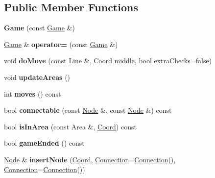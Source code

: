 \subsection*{Public Member Functions}
\begin{DoxyCompactItemize}
\item 
\hypertarget{classGame_aa79443880de5f26387c2a1c70c8c1aae}{{\bfseries Game} (const \hyperlink{classGame}{Game} \&)}\label{classGame_aa79443880de5f26387c2a1c70c8c1aae}

\item 
\hypertarget{classGame_aec1439ca4c76f4a002c235134d590158}{\hyperlink{classGame}{Game} \& {\bfseries operator=} (const \hyperlink{classGame}{Game} \&)}\label{classGame_aec1439ca4c76f4a002c235134d590158}

\item 
\hypertarget{classGame_a23882a4a63f1ea6c17bc6330440ff6f4}{void {\bfseries do\+Move} (const Line \&, \hyperlink{structCoord}{Coord} middle, bool extra\+Checks=false)}\label{classGame_a23882a4a63f1ea6c17bc6330440ff6f4}

\item 
\hypertarget{classGame_ac0652dbca9ce754f465cee5a81f508ae}{void {\bfseries update\+Areas} ()}\label{classGame_ac0652dbca9ce754f465cee5a81f508ae}

\item 
\hypertarget{classGame_a6134468ea7bb0bd23cc2b03a5f1a7e7c}{int {\bfseries moves} () const }\label{classGame_a6134468ea7bb0bd23cc2b03a5f1a7e7c}

\item 
\hypertarget{classGame_aa82304a9d084304f05ef8d8a6eeb732a}{bool {\bfseries connectable} (const \hyperlink{structNode}{Node} \&, const \hyperlink{structNode}{Node} \&) const }\label{classGame_aa82304a9d084304f05ef8d8a6eeb732a}

\item 
\hypertarget{classGame_a2c5aa5c26eb65e3f992701ac0408393e}{bool {\bfseries is\+In\+Area} (const Area \&, \hyperlink{structCoord}{Coord}) const }\label{classGame_a2c5aa5c26eb65e3f992701ac0408393e}

\item 
\hypertarget{classGame_a73b99aad84bf161b64ad012173528cfa}{bool {\bfseries game\+Ended} () const }\label{classGame_a73b99aad84bf161b64ad012173528cfa}

\item 
\hypertarget{classGame_ad377f36ff3fe304f6905f05427aa1ab2}{\hyperlink{structNode}{Node} \& {\bfseries insert\+Node} (\hyperlink{structCoord}{Coord}, \hyperlink{structConnection}{Connection}=\hyperlink{structConnection}{Connection}(), \hyperlink{structConnection}{Connection}=\hyperlink{structConnection}{Connection}())}\label{classGame_ad377f36ff3fe304f6905f05427aa1ab2}


\end{DoxyCompactItemize}
